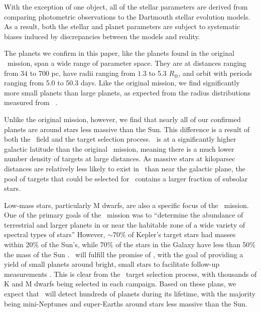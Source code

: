 With the exception of one object, all of the stellar parameters are derived from comparing
photometric observations to the Dartmouth stellar evolution models.
As a result, both the stellar and planet parameters are subject to systematic biases induced
by discrepancies between the models and reality.


The planets we confirm in this paper, like the planets found in the original \kep\ mission,
span a wide range of parameter space.
They are at distances ranging from $34$ to $700$ pc, have radii ranging from $1.3$ to
5.3 $R_\oplus$, and orbit with periods ranging from 5.0 to 50.3 days.
Like the original mission, we find significantly more small planets than large planets, as
expected from the radius distributions measured from \kep\
\citep{Howard12, Fressin13, Morton14}.

Unlike the original mission, however, we find that nearly all of our confirmed planets
are around stars less massive than the Sun.
This difference is a result of both the \Ci\ field and the target selection process.
\Ci\ is at a significantly higher galactic latitude than the original \kep\ mission,
meaning there is a much lower number density of targets at large distances.
As massive stars
at kiloparsec distances are relatively less likely to exist in \Ci\ than near the
galactic plane, the pool of targets that could be selected for \Ci\ contains a larger
fraction of subsolar stars.

Low-mass stars, particularly M dwarfs, are also a specific focus of the \KT\ mission.
One of the primary goals of the \kep\ mission was to ``determine the abundance of
terrestrial and larger planets in or near the habitable zone of a wide variety of spectral
types of stars'' \citep{Batalha13} However, $\sim70\%$ of Kepler's target stars had
masses within 20\%
of the Sun's, while 70\% of the stars in the Galaxy have less than 50\% the mass of the
Sun \citep{Brown11}.
\KT\ will fulfill the promise of \kep, with the goal of providing a yield of small planets
around bright, small stars to facilitate follow-up measurements \citep{Howell14}.
This is clear from the \KT\ target selection process, with thousands of K and M dwarfs
being selected in each campaign.
Based on these plans, we expect that \KT\ will detect hundreds of planets during its
lifetime, with the majority being mini-Neptunes and super-Earths around stars
less massive than the Sun.















